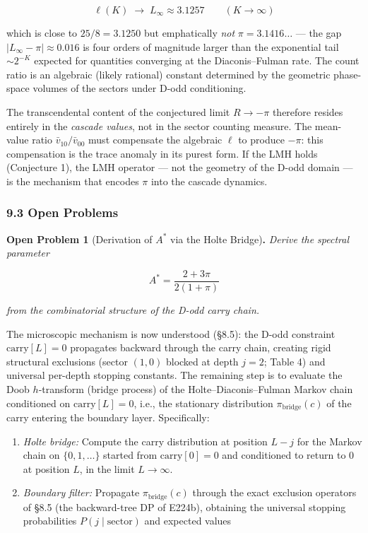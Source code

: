 \documentclass[
  11pt,
]{article}
\providecommand{\tightlist}{%
  \setlength{\itemsep}{0pt}\setlength{\parskip}{0pt}}
\begin{document}
\[\ell(K) \;\longrightarrow\; L_\infty \approx 3.1257 \qquad (K \to \infty)\]

which is close to \(25/8 = 3.1250\) but emphatically \emph{not}
\(\pi = 3.1416\ldots\) --- the gap \(|L_\infty - \pi| \approx 0.016\) is four
orders of magnitude larger than the exponential tail \(\sim 2^{-K}\) expected
for quantities converging at the Diaconis--Fulman rate. The count ratio is an
algebraic (likely rational) constant determined by the geometric phase-space
volumes of the sectors under D-odd conditioning.

The transcendental content of the conjectured limit \(R \to -\pi\) therefore
resides entirely in the \emph{cascade values}, not in the sector counting
measure. The mean-value ratio \(\bar{v}_{10}/\bar{v}_{00}\) must compensate the
algebraic \(\ell\) to produce \(-\pi\): this compensation is the trace anomaly
in its purest form. If the LMH holds (Conjecture 1), the LMH operator --- not
the geometry of the D-odd domain --- is the mechanism that encodes \(\pi\) into
the cascade dynamics.

\subsubsection{9.3 Open Problems}\label{open-problems}

\textbf{Open Problem 1} (Derivation of \(A^{\ast}\) via the Holte
Bridge)\textbf{.} \emph{Derive the spectral parameter}

\[A^{\ast} = \frac{2 + 3\pi}{2(1+\pi)}\]

\emph{from the combinatorial structure of the D-odd carry chain.}

The microscopic mechanism is now understood (§8.5): the D-odd constraint
\(\mathrm{carry}[L] = 0\) propagates backward through the carry chain, creating
rigid structural exclusions (sector \((1,0)\) blocked at depth \(j = 2\); Table
4) and universal per-depth stopping constants. The remaining step is to evaluate
the Doob \(h\)-transform (bridge process) of the Holte--Diaconis--Fulman Markov
chain conditioned on \(\mathrm{carry}[L] = 0\), i.e., the stationary
distribution \(\pi_{\mathrm{bridge}}(c)\) of the carry entering the boundary
layer. Specifically:

\begin{enumerate}
\def\labelenumi{\arabic{enumi}.}
\tightlist
\item
  \emph{Holte bridge:} Compute the carry distribution at position \(L - j\) for
  the Markov chain on \(\lbrace{}0, 1, \ldots\rbrace{}\) started from
  \(\mathrm{carry}[0] = 0\) and conditioned to return to \(0\) at position
  \(L\), in the limit \(L \to \infty\).
\item
  \emph{Boundary filter:} Propagate \(\pi_{\mathrm{bridge}}(c)\) through the
  exact exclusion operators of §8.5 (the backward-tree DP of E224b), obtaining
  the universal stopping probabilities \(P(j \mid \mathrm{sector})\) and
  expected values
\end{enumerate}
\end{document}
